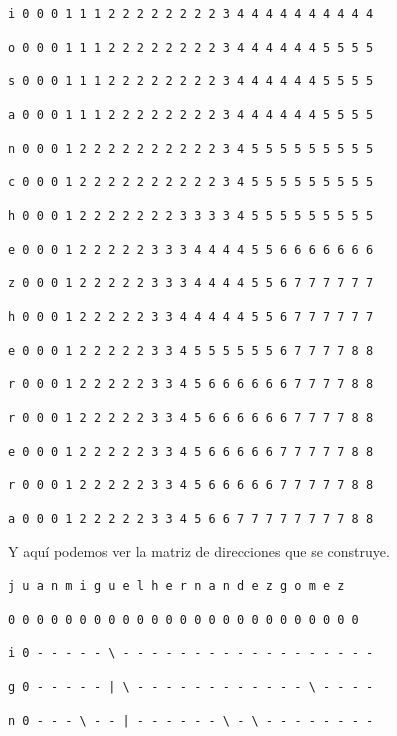 \documentclass[11pt,a4paper]{article} %
\begin{document}
\texttt{i 0 0 0 1 1 1 2 2 2 2 2 2 2 2 3 4 4 4 4 4 4 4 4 4 4}

\texttt{o 0 0 0 1 1 1 2 2 2 2 2 2 2 2 3 4 4 4 4 4 4 5 5 5 5}

\texttt{s 0 0 0 1 1 1 2 2 2 2 2 2 2 2 3 4 4 4 4 4 4 5 5 5 5}

\texttt{a 0 0 0 1 1 1 2 2 2 2 2 2 2 2 3 4 4 4 4 4 4 5 5 5 5}

\texttt{n 0 0 0 1 2 2 2 2 2 2 2 2 2 2 3 4 5 5 5 5 5 5 5 5 5}

\texttt{c 0 0 0 1 2 2 2 2 2 2 2 2 2 2 3 4 5 5 5 5 5 5 5 5 5}

\texttt{h 0 0 0 1 2 2 2 2 2 2 2 3 3 3 3 4 5 5 5 5 5 5 5 5 5}

\texttt{e 0 0 0 1 2 2 2 2 2 3 3 3 4 4 4 4 5 5 6 6 6 6 6 6 6}

\texttt{z 0 0 0 1 2 2 2 2 2 3 3 3 4 4 4 4 5 5 6 7 7 7 7 7 7}

\texttt{h 0 0 0 1 2 2 2 2 2 3 3 4 4 4 4 4 5 5 6 7 7 7 7 7 7}

\texttt{e 0 0 0 1 2 2 2 2 2 3 3 4 5 5 5 5 5 5 6 7 7 7 7 8 8}

\texttt{r 0 0 0 1 2 2 2 2 2 3 3 4 5 6 6 6 6 6 6 7 7 7 7 8 8}

\texttt{r 0 0 0 1 2 2 2 2 2 3 3 4 5 6 6 6 6 6 6 7 7 7 7 8 8}

\texttt{e 0 0 0 1 2 2 2 2 2 3 3 4 5 6 6 6 6 6 7 7 7 7 7 8 8}

\texttt{r 0 0 0 1 2 2 2 2 2 3 3 4 5 6 6 6 6 6 7 7 7 7 7 8 8}

\texttt{a 0 0 0 1 2 2 2 2 2 3 3 4 5 6 6 7 7 7 7 7 7 7 7 8 8}\\

\normalsize


Y aquí podemos ver la matriz de direcciones que se construye.\\

\small

\hspace{1,72 em} \texttt{j u a n m i g u e l h e r n a n d e z g o m e z}

\hspace{0,71 em} \texttt{0 0 0 0 0 0 0 0 0 0 0 0 0 0 0 0 0 0 0 0 0 0 0 0 0}

\texttt{i 0 - - - - - \textbackslash{ }- - - - - - - - - - - - - - - - - -}

\texttt{g 0 - - - - - | \textbackslash{ }- - - - - - - - - - - - \textbackslash{ }- - - -}

\texttt{n 0 - - - \textbackslash{ }- - | - - - - - - \textbackslash{ }- \textbackslash{ }- - - - - - - -}
\end{document}
